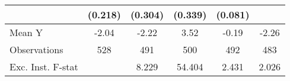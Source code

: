 {\begin{tabular}{l*{5}{c}}
            &     (0.218)         &     (0.304)         &     (0.339)         &     (0.081)         &                     \\
\midrule
Mean Y      &       -2.04         &       -2.22         &        3.52         &       -0.19         &       -2.26         \\
Observations&         528         &         491         &         500         &         492         &         483         \\
Exc. Inst. F-stat&                     &       8.229         &      54.404         &       2.431         &       2.026         \\
\bottomrule
\end{tabular}
}
